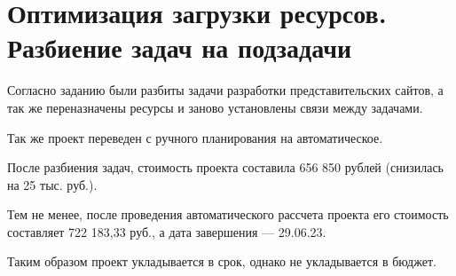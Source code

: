 \section{Оптимизация загрузки ресурсов. Разбиение задач на подзадачи}

Согласно заданию были разбиты задачи разработки представительских сайтов, а так же переназначены ресурсы и заново установлены связи между задачами.


Так же проект переведен с ручного планирования на автоматическое.


После разбиения задач, стоимость проекта составила 656 850 рублей (снизилась на 25 тыс. руб.).

Тем не менее, после проведения автоматического рассчета проекта его стоимость составляет 722 183,33 руб., а дата завершения --- 29.06.23.

Таким образом проект укладывается в срок, однако не укладывается в бюджет.